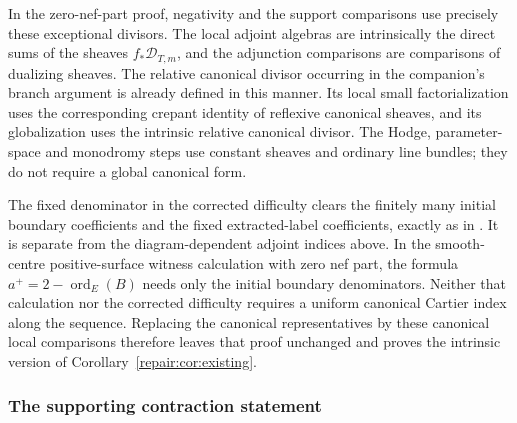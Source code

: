 In the zero-nef-part proof, negativity and the support comparisons
use precisely these exceptional divisors. The local adjoint algebras
are intrinsically the direct sums of the sheaves
$f_*\mathcal D_{T,m}$, and the adjunction comparisons are comparisons
of dualizing sheaves. The relative canonical divisor occurring in the
companion's branch argument is already defined in this manner.
Its local small factorialization uses the corresponding crepant
identity of reflexive canonical sheaves, and its globalization uses
the intrinsic relative canonical divisor. The Hodge, parameter-space
and monodromy steps use constant sheaves and ordinary line bundles;
they do not require a global canonical form.

The fixed denominator in the corrected difficulty clears the finitely
many initial boundary coefficients and the fixed extracted-label
coefficients, exactly as in \cite{OAI:Termination-of-generalized-log-canonical-flips-on-compact-Kahler-fourfolds-October-5-2026}. It is separate from the
diagram-dependent adjoint indices above. In the smooth-centre
positive-surface witness calculation with zero nef part, the formula
$a^+=2-\operatorname{ord}_E(B)$ needs only the initial boundary
denominators. Neither that calculation nor the corrected difficulty
requires a uniform canonical Cartier index along the sequence.
Replacing the canonical representatives by these canonical local
comparisons therefore leaves that proof unchanged and proves the
intrinsic version of Corollary~\ref{repair:cor:existing}.

\subsubsection{The supporting contraction statement}

